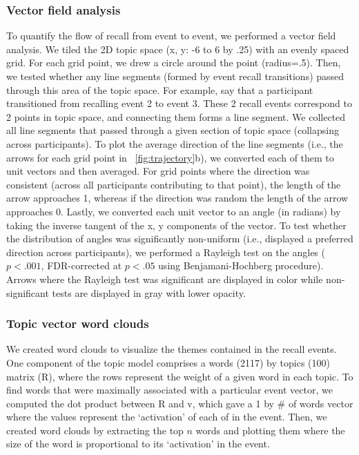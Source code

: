 \documentclass{article}
\begin{document}
\subsubsection{Vector field analysis}
To quantify the flow of recall from event to event, we performed a vector field analysis.  We tiled the 2D topic space (x, y: -6 to 6 by .25) with an evenly spaced grid. For each grid point, we drew a circle around the point (radius=.5). Then, we tested whether any line segments (formed by event recall transitions) passed through this area of the topic space.  For example, say that a participant transitioned from recalling event 2 to event 3. These 2 recall events correspond to 2 points in topic space, and connecting them forms a line segment. We collected all line segments that passed through a given section of topic space (collapsing across participants). To plot the average direction of the line segments (i.e., the arrows for each grid point in ~\ref{fig:trajectory}b), we converted each of them to unit vectors and then averaged. For grid points where the direction was consistent (across all participants contributing to that point), the length of the arrow approaches 1, whereas if the direction was random the length of the arrow approaches 0. Lastly, we converted each unit vector to an angle (in radians) by taking the inverse tangent of the x, y components of the vector. To test whether the distribution of angles was significantly non-uniform (i.e., displayed a preferred direction across participants), we performed a Rayleigh test on the angles ($p<.001$, FDR-corrected at $p<.05$ using Benjamani-Hochberg procedure). Arrows where the Rayleigh test was significant are displayed in color while non-significant tests are displayed in gray with lower opacity.

\subsubsection{Topic vector word clouds}
We created word clouds to visualize the themes contained in the recall events. One component of the topic model comprises a words (2117) by topics (100) matrix (R), where the rows represent the weight of a given word in each topic.  To find words that were maximally associated with a particular event vector, we computed the dot product between R and v, which gave a 1 by \# of words vector where the values represent the `activation' of each of in the event. Then, we created word clouds by extracting the top $n$ words and plotting them where the size of the word is proportional to its `activation' in the event.
\end{document}
